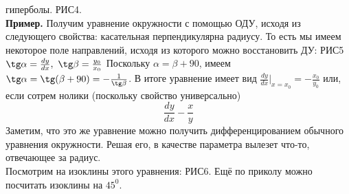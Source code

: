 гиперболы. РИС4. \\
\textbf{Пример.} Получим уравнение окружности с помощью ОДУ, исходя из 
следующего свойства: касательная перпендикулярна радиусу. То есть мы имеем 
некоторое поле направлений, исходя из которого можно восстановить ДУ:
РИС5
$\tg\alpha=\frac{dy}{dx},~\tg\beta=\frac{y_0}{x_0}$ 
Поскольку $\alpha=\beta+90$, имеем
$\tg\alpha=\tg(\beta+90)=-\frac{1}{\tg\beta}$. В итоге уравнение имеет вид
$\frac{dy}{dx}\big|_{x=x_0}=-\frac{x_0}{y_0}$
или, если сотрем нолики (поскольку свойство универсально)
$$\frac{dy}{dx}-\frac{x}{y}$$
Заметим, что это же уравнение можно получить дифференцированием обычного
уравнения окружности. Решая его, в качестве параметра вылезет что-то, 
отвечающее за радиус. \\
Посмотрим на изоклины этого уравнения: РИС6. Ещё по приколу можно посчитать 
изоклины на $45^0$.










